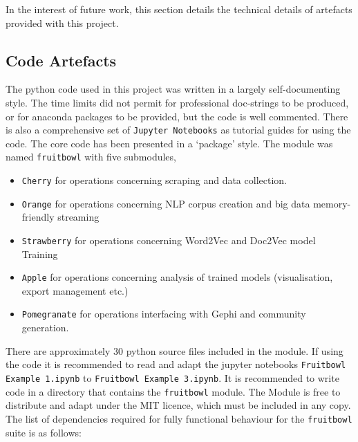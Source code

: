 In the interest of future work, this section details the technical details of artefacts provided with this project.

\subsection{Code Artefacts}
The python code used in this project was written in a largely self-documenting style. The time limits did not permit for professional doc-strings to be produced, or for anaconda packages to be provided, but the code is well commented. There is also a comprehensive set of \texttt{Jupyter Notebooks} as tutorial guides for using the code\cite{jupyter}. The core code has been presented in a `package' style.  The module was named \texttt{fruitbowl} with five submodules,
\begin{itemize}
\itemsep-.6em
\item \texttt{Cherry} for operations concerning scraping and data collection.
\item \texttt{Orange} for operations concerning NLP corpus creation and big data memory-friendly streaming
\item \texttt{Strawberry} for operations concerning Word2Vec and Doc2Vec model Training
\item \texttt{Apple} for operations concerning analysis of trained models (visualisation, export management etc.)
\item \texttt{Pomegranate} for operations interfacing with Gephi and community generation.
\end{itemize} 
There are approximately 30 python source files included in the module. If using the code it is recommended to read and adapt the jupyter notebooks \texttt{Fruitbowl Example 1.ipynb} to \texttt{Fruitbowl Example 3.ipynb}. It is recommended to write code in a directory that contains the \texttt{fruitbowl} module. The Module is free to distribute and adapt under the MIT licence, which must be included in any copy.  The list of dependencies required for fully functional behaviour for the \texttt{fruitbowl} suite is as follows:
